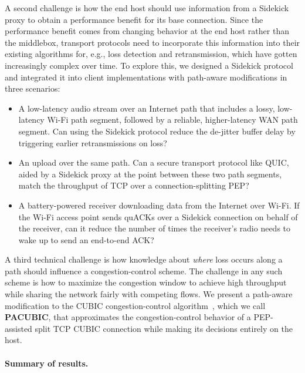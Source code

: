 A second challenge is how the end host should use information from a Sidekick
proxy to obtain a performance benefit for its base connection. Since the
performance benefit comes from changing behavior at the end host rather than
the middlebox, transport protocols need to incorporate this information into
their existing algorithms for, e.g., loss detection and retransmission, which
have gotten increasingly complex over time. To explore this, we designed a
Sidekick protocol and integrated it into client implementations with path-aware
modifications in three scenarios:
\begin{itemize}[noitemsep,topsep=2pt]
\item A low-latency audio stream over an Internet path that includes a lossy,
  low-latency Wi-Fi path segment, followed by a reliable, higher-latency WAN
  path segment. Can using the Sidekick protocol reduce the de-jitter buffer
  delay by triggering earlier retransmissions on loss?

\item An upload over the same path. Can a secure transport protocol like QUIC,
  aided by a Sidekick proxy at the point between these two path segments, match
  the throughput of TCP over a connection-splitting PEP?

\item A battery-powered receiver downloading data from the Internet over Wi-Fi.
  If the Wi-Fi access point sends quACKs over a Sidekick connection on behalf of
  the receiver,
  can it reduce the number of times the receiver's radio needs to wake up
  to send an end-to-end ACK?
\end{itemize}

\smallskip

A third technical challenge is how knowledge about \emph{where}
loss occurs along a path should influence a congestion-control scheme.
The challenge in any such scheme is how to maximize the congestion window
to achieve high throughput
while sharing the network fairly with competing flows.
We present a path-aware modification to the CUBIC congestion-control
algorithm~\cite{ha2008cubic}, which we call \mbox{\textbf{PACUBIC}},
that approximates the congestion-control behavior of a PEP-assisted split TCP
CUBIC connection while making its decisions entirely on the host.

\paragraph{Summary of results.}


